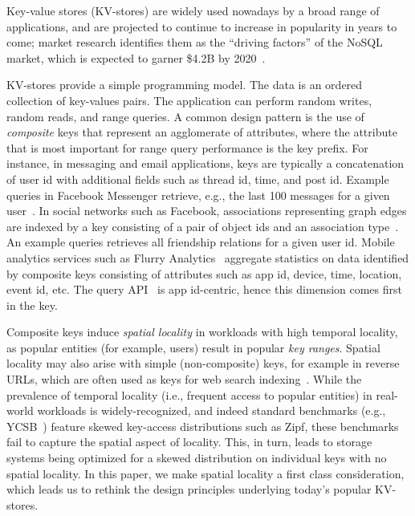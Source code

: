 Key-value stores (KV-stores) are widely used nowadays by a broad range of applications, and are projected
to continue to increase in popularity in years to come; market research  identifies them as the 
``driving factors'' of the NoSQL market, which is expected to garner \$4.2B by 2020~\cite{alliedmarketresearch}.

KV-stores provide a simple programming model. 
The data is an ordered collection of key-values pairs. The application can perform random writes, 
random reads, and range queries. A common design pattern is the use of \emph{composite} 
keys that represent an agglomerate of attributes, where the attribute that is most important for range query
performance is the key prefix. 
For instance,  in messaging and email applications, keys are typically a concatenation of user id with additional fields 
such as thread id, time, and post id. Example queries in Facebook Messenger retrieve, e.g., the last 100 messages for a 
given user~\cite{Borthakur:2011:AHG:1989323.1989438}. %
In social networks such as Facebook, associations representing graph edges are indexed by a key consisting of a 
pair of object ids and an association type~\cite{Armstrong:2013:LDB:2463676.2465296}.
An example queries retrieves all friendship relations for a given user id.  
Mobile analytics services such as Flurry Analytics~\cite{flurry} aggregate statistics 
on data identified by composite keys consisting of attributes such as app id, device, time, location, 
event id, etc. The query API~\cite{flurry-api} is app id-centric, hence this dimension comes first 
in the key.

Composite keys induce \emph{spatial locality} in workloads with high {temporal locality}, as 
popular entities (for example, users) result in popular \emph{key ranges}. 
Spatial locality may also arise with simple (non-composite) keys, for example in 
 reverse  URLs, which  are often used as keys for web search indexing~\cite{Cho:1998:ECT:297805.297835}. 
While the prevalence of temporal locality (i.e., frequent access to popular entities) in real-world workloads is widely-recognized, 
and indeed standard benchmarks (e.g., YCSB~\cite{YCSB})  feature skewed key-access distributions such as Zipf, 
these benchmarks fail to capture the spatial aspect of locality.
This, in turn, leads to storage systems being optimized for a skewed distribution on individual keys with no spatial locality.
In this paper, we make spatial locality a first class  consideration, which 
leads us to rethink the design principles underlying today's popular KV-stores.

